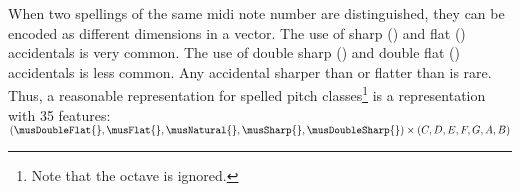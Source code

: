 
When two spellings of the same \gls{midi} note number are
distinguished, they can be encoded as different dimensions
in a vector. The use of sharp (\musSharp{}) and flat
(\musFlat{}) accidentals is very common. The use of double
sharp (\musDoubleSharp{}) and double flat (\musDoubleFlat{})
accidentals is less common. Any accidental sharper than
\musDoubleSharp{} or flatter than \musDoubleFlat{} is rare.
Thus, a reasonable representation for spelled pitch
classes\footnote{Note that the octave is ignored.} is a
representation with 35 features: $(\musDoubleFlat{},
\musFlat{}, \musNatural{}, \musSharp{}, \musDoubleSharp{})
\times (C, D, E, F, G, A, B)$
